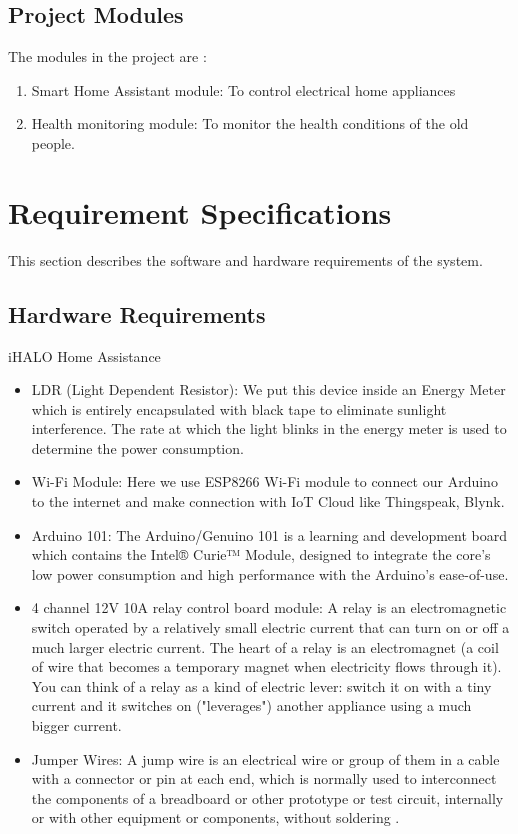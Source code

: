 \section{Project Modules}
\thispagestyle{fancy}
The modules in the project are :
\begin{enumerate}
	\item Smart Home Assistant module: To control electrical home appliances
	\item  Health monitoring module: To monitor the health conditions of the old people.
\end{enumerate}

\chapter{Requirement Specifications}
\thispagestyle{fancy}
This section describes the software and hardware requirements of the system.
\section{Hardware Requirements}
iHALO Home Assistance
\begin{itemize}
	\item  LDR (Light Dependent Resistor): We put this device inside an Energy Meter which is entirely encapsulated with black tape to eliminate sunlight interference. The rate at which the light blinks in the energy meter is used to determine the power consumption.
	\item  Wi-Fi Module: Here we use ESP8266 Wi-Fi module to connect our Arduino to the internet and make connection with IoT Cloud like Thingspeak, Blynk.
	\item  Arduino 101: The Arduino/Genuino 101 is a learning and development board which contains the Intel® Curie™ Module, designed to integrate the core's low power consumption and high performance with the Arduino's ease-of-use.
	\item  4 channel 12V 10A relay control board module: A relay is an electromagnetic switch operated by a relatively small electric current that can turn on or off a much larger electric current. The heart of a relay is an electromagnet (a coil of wire that becomes a temporary magnet when electricity flows through it). You can think of a relay as a kind of electric lever: switch it on with a tiny current and it switches on ("leverages") another appliance using a much bigger current.
	\item  Jumper Wires: A jump wire is an electrical wire or group of them in a cable with a connector or pin at each end, which is normally used to interconnect the components of a breadboard or other prototype or test circuit, internally or with other equipment or components, without soldering .
\end{itemize}

